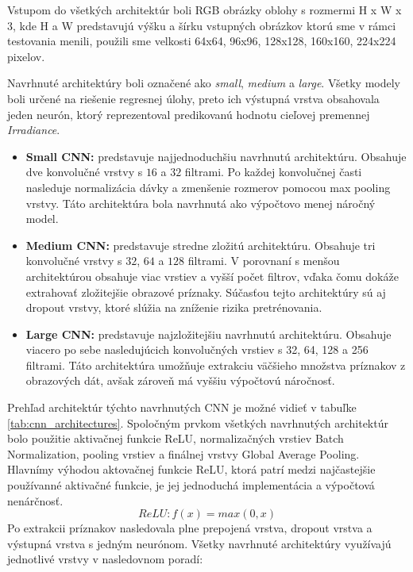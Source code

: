 Vstupom do všetkých architektúr boli RGB obrázky oblohy s rozmermi H x W x 3, kde H a W predstavujú výšku a šírku vstupných obrázkov ktorú sme v rámci testovania menili, použili sme velkosti 64x64, 96x96, 128x128, 160x160, 224x224 pixelov.   

Navrhnuté architektúry boli označené ako \textit{small}, \textit{medium} a \textit{large}. Všetky modely 
boli určené na riešenie regresnej úlohy, preto ich výstupná vrstva obsahovala jeden neurón, ktorý 
reprezentoval predikovanú hodnotu cieľovej premennej \textit{Irradiance}.

\begin{itemize}
    \item \textbf{Small CNN:} predstavuje najjednoduchšiu navrhnutú architektúru. Obsahuje dve konvolučné 
    vrstvy s $16$ a $32$ filtrami. Po každej konvolučnej časti nasleduje normalizácia dávky a zmenšenie rozmerov 
    pomocou max pooling vrstvy. Táto architektúra bola navrhnutá ako výpočtovo menej náročný model.

    \item \textbf{Medium CNN:} predstavuje stredne zložitú architektúru. Obsahuje tri konvolučné vrstvy s 
    $32$, $64$ a $128$ filtrami. V porovnaní s menšou architektúrou obsahuje viac vrstiev a vyšší počet 
    filtrov, vďaka čomu dokáže extrahovať zložitejšie obrazové príznaky. Súčasťou tejto architektúry sú 
    aj dropout vrstvy, ktoré slúžia na zníženie rizika pretrénovania.

    \item \textbf{Large CNN:} predstavuje najzložitejšiu navrhnutú architektúru. Obsahuje viacero po sebe 
    nasledujúcich konvolučných vrstiev s 32, 64, 128 a 256 filtrami. Táto architektúra umožňuje extrakciu 
    väčšieho množstva príznakov z obrazových dát, avšak zároveň má vyššiu výpočtovú náročnosť.
\end{itemize}
Prehľad architektúr týchto navrhnutých CNN je možné vidieť v tabuľke \ref{tab:cnn_architectures}.
Spoločným prvkom všetkých navrhnutých architektúr bolo použitie aktivačnej funkcie ReLU, 
normalizačných vrstiev Batch Normalization, pooling vrstiev a finálnej vrstvy Global Average Pooling. 
Hlavnímy výhodou aktovačnej funkcie ReLU, ktorá patrí medzi najčastejšie používanné aktivačné funkcie, je jej jednoduchá implementácia a výpočtová nenárčnosť.
\begin{equation*}
	ReLU: f(x) = max(0, x)
\end{equation*}
Po extrakcii príznakov nasledovala plne prepojená vrstva, dropout vrstva a výstupná vrstva s jedným neurónom. Všetky navrhnuté architektúry využívajú jednotlivé vrstvy v nasledovnom poradí:

